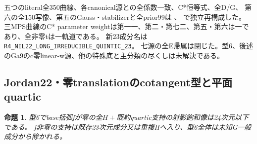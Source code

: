 \documentclass[a4paper,11pt]{ltjsarticle}
\newtheorem{proposition}{命題}[section]
\theoremstyle{definition}
\begin{document}
五つのliteral全350曲線、各canonical源との全係数一致、C*恒等式、全D/G、
第六の全150写像、第五のGauss・stabilizerと全prior99は
、
で独立再構成した。
三MPS曲線のC* parameter weightは第一一、第二・第七二、第五・第六は一であり、全非零tは一軌道である。
新23成分名は\texttt{R4\_NIL22\_LONG\_IRREDUCIBLE\_QUINTIC\_23}。
七源の全E帰属は閉じた。型6、後述のGa9のc零linear-w源、他の特殊底と主分類の尽くしは未解決である。

\subsection{Jordan22・零translationのcotangent型と平面quartic}
\begin{proposition}\label{prop:quartic-nil22-cotangent-bound}
型6でbase括弧fが零の全$H+$既約quartic支持の射影飽和像は24次元以下である。
f非零の支持は既存23次元成分又は重複Hへ入り、型6全体は未知G一般成分から除かれる。
\end{proposition}
\end{document}
